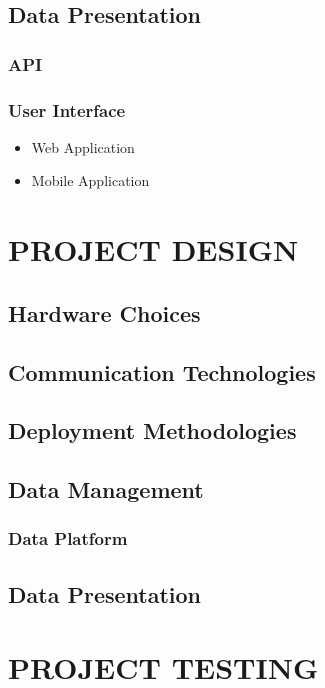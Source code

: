 \documentclass[10pt,twocolumn]{witseiepaper}
\begin{document}
	\subsection{Data Presentation}
		\subsubsection{API}
		\subsubsection{User Interface}
			\begin{itemize}
				\item Web Application
				\item Mobile Application
			\end{itemize}

\section{PROJECT DESIGN}
	\subsection{Hardware Choices}
	
	\subsection{Communication Technologies}
	
	\subsection{Deployment Methodologies}
	
	\subsection{Data Management}

	\subsubsection{Data Platform}

	\subsection{Data Presentation}
	
\section{PROJECT TESTING}
\end{document}
